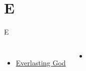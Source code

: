 \documentclass{beamer}
\begin{document}
\section{E}

\begin{frame}[t]{E}
\begin{columns}[t]
        \begin{itemize}
    \item \hyperlink{Everlasting God['Strength will rise']}{Everlasting God } \phantom{ 1 1 1 1 1 1 1 1 1 1}
\end{itemize}
        \begin{itemize}
            \item[] \phantom{1}\end{itemize}


\end{columns}

\end{frame}
\end{document}

